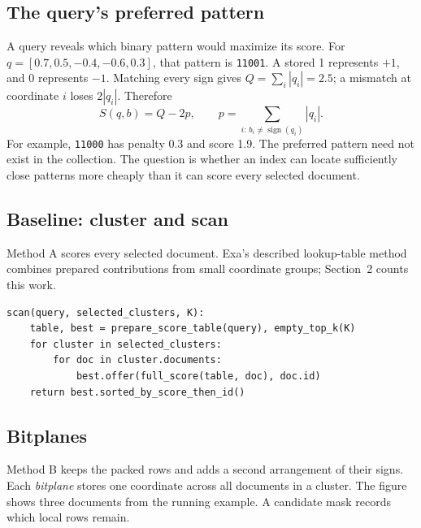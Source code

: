 \subsection{The query's preferred pattern}
A query reveals which binary pattern would maximize its score. For
$q=[0.7,0.5,-0.4,-0.6,0.3]$, that pattern is \texttt{11001}. A stored 1 represents $+1$,
and 0 represents $-1$. Matching every sign gives $Q=\sum_i|q_i|=2.5$; a mismatch at coordinate
$i$ loses $2|q_i|$. Therefore
\begin{equation}
 S(q,b)=Q-2p,\qquad p=\sum_{i:\,b_i\ne\operatorname{sign}(q_i)}|q_i|.
 \label{eq:score}
\end{equation}
For example, \texttt{11000} has penalty 0.3 and score 1.9. The preferred pattern need not exist
in the collection. The question is whether an index can locate sufficiently close patterns
more cheaply than it can score every selected document.

\subsection{Baseline: cluster and scan}
Method A scores every selected document. Exa's described lookup-table method~\cite{exa}
combines prepared contributions from small coordinate groups; Section~2 counts this work.
\begin{lstlisting}
scan(query, selected_clusters, K):
    table, best = prepare_score_table(query), empty_top_k(K)
    for cluster in selected_clusters:
        for doc in cluster.documents:
            best.offer(full_score(table, doc), doc.id)
    return best.sorted_by_score_then_id()
\end{lstlisting}

\newpage
\subsection{Bitplanes}
Method B keeps the packed rows and adds a second arrangement of their signs. Each
\emph{bitplane} stores one coordinate across all documents in a cluster. The figure shows
three documents from the running example. A candidate mask records which local rows remain.

